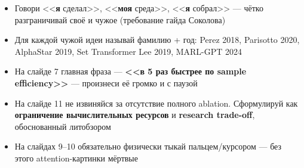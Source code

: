 \documentclass[a4paper,12pt]{extarticle}
\begin{document}
\begin{itemize}[noitemsep]
  \item Говори <<\textbf{я} сделал>>, <<\textbf{моя} среда>>, <<\textbf{я} собрал>> --- чётко разграничивай своё и чужое (требование гайда Соколова)
  \item Для каждой чужой идеи называй фамилию + год: Perez 2018, Parisotto 2020, AlphaStar 2019, Set Transformer Lee 2019, MARL-GPT 2024
  \item На слайде 7 главная фраза --- \textbf{<<в 5 раз быстрее по sample efficiency>>} --- произнеси её громко и с паузой
  \item На слайде 11 не извиняйся за отсутствие полного ablation. Сформулируй как \textbf{ограничение вычислительных ресурсов} и \textbf{research trade-off}, обоснованный литобзором
  \item На слайдах 9--10 обязательно физически тыкай пальцем/курсором --- без этого attention-картинки мёртвые
\end{itemize}
\end{document}
